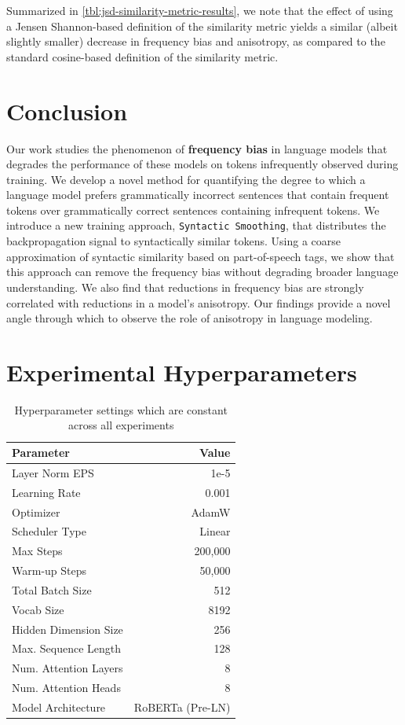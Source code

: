 Summarized in \cref{tbl:jsd-similarity-metric-results}, we note that the effect of using a Jensen Shannon-based definition of the similarity metric yields a similar (albeit slightly smaller) decrease in frequency bias and anisotropy, as compared to the standard cosine-based definition of the similarity metric.   
\section{Conclusion}

Our work studies the phenomenon of \textbf{frequency bias} in language models that degrades the performance of these models on tokens infrequently observed during training. We develop a novel method for quantifying the degree to which a language model prefers grammatically incorrect sentences that contain frequent tokens over grammatically correct sentences containing infrequent tokens.  We introduce a new training approach, \texttt{Syntactic Smoothing}, that distributes the backpropagation signal to syntactically similar tokens. Using a coarse approximation of syntactic similarity based on part-of-speech tags, we show that this approach can remove the frequency bias without degrading broader language understanding. We also find that reductions in frequency bias are strongly correlated with reductions in a model's anisotropy. Our findings provide a novel angle through which to observe the role of anisotropy in language modeling. 

\section{Experimental Hyperparameters}
\label{section:appendix-hyperparameters}
\begin{table}[ht!]
    \centering
    \small
    \begin{tabular}{l|r}
        \toprule
             Parameter & Value \\
        \midrule
             Layer Norm EPS& 1e-5 \\
             Learning Rate & 0.001 \\
             Optimizer & AdamW \\
             Scheduler Type & Linear\\
             Max Steps & 200,000 \\
             Warm-up Steps & 50,000 \\
             Total Batch Size & 512 \\
             Vocab Size & 8192 \\
             Hidden Dimension Size & 256 \\
             Max. Sequence Length & 128 \\
             Num. Attention Layers & 8 \\
             Num. Attention Heads & 8 \\
             Model Architecture & RoBERTa (Pre-LN) \\
        \bottomrule
    \end{tabular}
    \caption{Hyperparameter settings which are constant across all experiments}
    \label{tbl:appendix_hyperparams}
\end{table}

